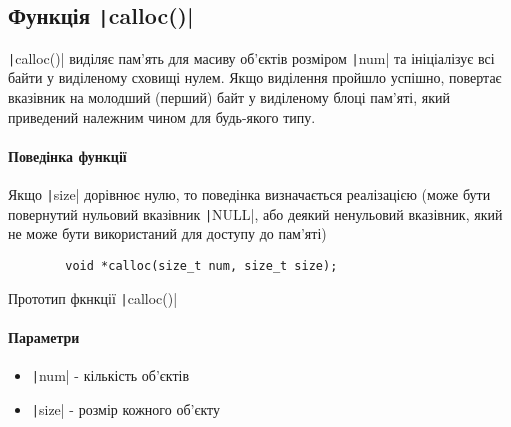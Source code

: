 \subsection[Функція \code{calloc()}]{Функція \texttt|calloc()|}
\texttt|calloc()| виділяє пам'ять для масиву об'єктів розміром \texttt|num| та ініціалізує всі байти у виділеному сховищі нулем.
Якщо виділення пройшло успішно, повертає вказівник на молодший (перший) байт у виділеному блоці пам'яті, який приведений належним чином для будь-якого типу.
\paragraph{Поведінка функції}
Якщо \texttt|size| дорівнює нулю, то поведінка визначається реалізацією (може бути повернутий нульовий вказівник \texttt|NULL|, або деякий ненульовий вказівник, який не може бути використаний для доступу до пам'яті)
\begin{listing}[H]
	\begin{verbatim}
		void *calloc(size_t num, size_t size);
	\end{verbatim}
	\caption[Прототип ]{Прототип фкнкції \texttt|calloc()|}
	\label{lst:f:calloc}
\end{listing}
\paragraph{Параметри}
\begin{itemize}
	\item \texttt|num| - кількість об'єктів
	\item \texttt|size| - розмір кожного об'єкту
\end{itemize}


